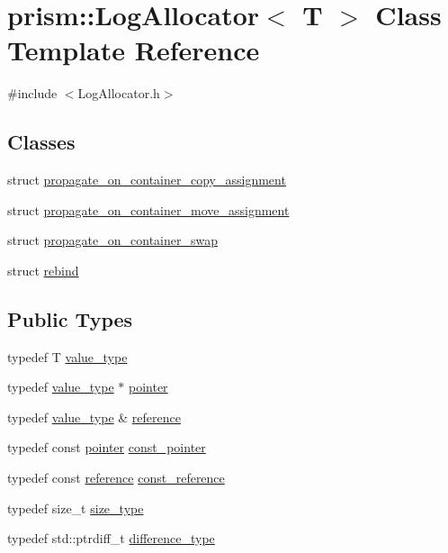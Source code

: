 \hypertarget{classprism_1_1_log_allocator}{}\section{prism\+:\+:Log\+Allocator$<$ T $>$ Class Template Reference}
\label{classprism_1_1_log_allocator}


{\ttfamily \#include $<$Log\+Allocator.\+h$>$}

\subsection*{Classes}
\begin{DoxyCompactItemize}
\item 
struct \hyperlink{structprism_1_1_log_allocator_1_1propagate__on__container__copy__assignment}{propagate\+\_\+on\+\_\+container\+\_\+copy\+\_\+assignment}
\item 
struct \hyperlink{structprism_1_1_log_allocator_1_1propagate__on__container__move__assignment}{propagate\+\_\+on\+\_\+container\+\_\+move\+\_\+assignment}
\item 
struct \hyperlink{structprism_1_1_log_allocator_1_1propagate__on__container__swap}{propagate\+\_\+on\+\_\+container\+\_\+swap}
\item 
struct \hyperlink{structprism_1_1_log_allocator_1_1rebind}{rebind}
\end{DoxyCompactItemize}
\subsection*{Public Types}
\begin{DoxyCompactItemize}
\item 
typedef T \hyperlink{classprism_1_1_log_allocator_a84ee349868301d14e91f9876bbf2de27}{value\+\_\+type}
\item 
typedef \hyperlink{classprism_1_1_log_allocator_a84ee349868301d14e91f9876bbf2de27}{value\+\_\+type} $\ast$ \hyperlink{classprism_1_1_log_allocator_aa95e52dd075368ba542af3da925e6c16}{pointer}
\item 
typedef \hyperlink{classprism_1_1_log_allocator_a84ee349868301d14e91f9876bbf2de27}{value\+\_\+type} \& \hyperlink{classprism_1_1_log_allocator_a736d959fa8370b20de2bac647b3ddf8c}{reference}
\item 
typedef const \hyperlink{classprism_1_1_log_allocator_aa95e52dd075368ba542af3da925e6c16}{pointer} \hyperlink{classprism_1_1_log_allocator_a3533183bc11b2c633d54d7504b515c77}{const\+\_\+pointer}
\item 
typedef const \hyperlink{classprism_1_1_log_allocator_a736d959fa8370b20de2bac647b3ddf8c}{reference} \hyperlink{classprism_1_1_log_allocator_a8dd85b419a302b7d9cf946726a240a4d}{const\+\_\+reference}
\item 
typedef size\+\_\+t \hyperlink{classprism_1_1_log_allocator_a23a86945109072959b47b6becda9925f}{size\+\_\+type}
\item 
typedef std\+::ptrdiff\+\_\+t \hyperlink{classprism_1_1_log_allocator_a5cc7253b1e10c86645bd8dbd3ea70858}{difference\+\_\+type}
\end{DoxyCompactItemize}
